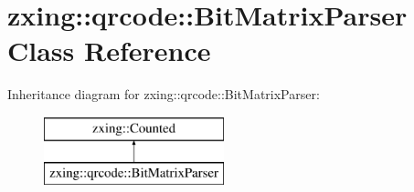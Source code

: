 \hypertarget{classzxing_1_1qrcode_1_1_bit_matrix_parser}{}\section{zxing\+:\+:qrcode\+:\+:Bit\+Matrix\+Parser Class Reference}
\label{classzxing_1_1qrcode_1_1_bit_matrix_parser}
Inheritance diagram for zxing\+:\+:qrcode\+:\+:Bit\+Matrix\+Parser\+:\begin{figure}[H]
\begin{center}
\leavevmode
\includegraphics[height=2.000000cm]{classzxing_1_1qrcode_1_1_bit_matrix_parser}
\end{center}
\end{figure}
